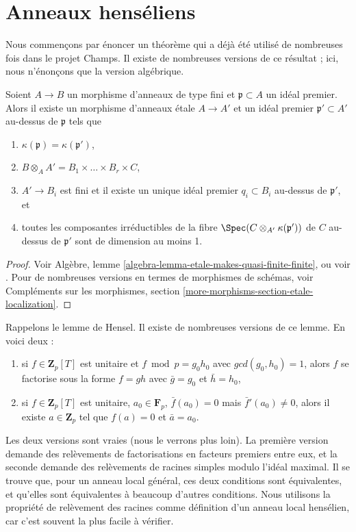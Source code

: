 \section{Anneaux hens\'eliens}
\label{section-henselian-ring}

\noindent
Nous commen\c{c}ons par \'enoncer un th\'eor\`eme qui a d\'ej\`a \'et\'e utilis\'e de nombreuses fois
dans le projet Champs. Il existe de nombreuses versions de ce r\'esultat ; ici, nous
n'\'enon\c{c}ons que la version alg\'ebrique.

\begin{theorem}
\label{theorem-quasi-finite-etale-locally}
Soient $A\to B$ un morphisme d'anneaux de type fini et $\mathfrak p \subset A$ un
id\'eal premier. Alors il existe un morphisme d'anneaux \'etale $A \to A'$ et un id\'eal premier
$\mathfrak p' \subset A'$ au-dessus de $\mathfrak p$ tels que
\begin{enumerate}
\item
$\kappa(\mathfrak p) = \kappa(\mathfrak p')$,
\item
$ B \otimes_A A' = B_1\times \ldots \times B_r \times C$,
\item
$ A'\to B_i$ est fini et il existe un unique id\'eal premier $q_i\subset B_i$ au-dessus
de $\mathfrak p'$, et
\item toutes les composantes irr\'eductibles de la fibre
$\Spec(C \otimes_{A'} \kappa(\mathfrak p'))$ de $C$ au-dessus de $\mathfrak p'$
sont de dimension au moins 1.
\end{enumerate}
\end{theorem}

\begin{proof}
Voir Algèbre, lemme \ref{algebra-lemma-etale-makes-quasi-finite-finite}, ou
voir \cite[Th\'eor\`eme 18.12.1]{EGA4}. Pour de nombreuses versions en termes de
morphismes de sch\'emas, voir
Compléments sur les morphismes, section \ref{more-morphisms-section-etale-localization}.
\end{proof}

\noindent
Rappelons le lemme de Hensel.
Il existe de nombreuses versions de ce lemme. En voici deux :
\begin{enumerate}
\item[(f)] si $f\in \mathbf{Z}_p[T]$ est unitaire et
$f \bmod p = g_0 h_0$ avec $gcd(g_0, h_0) = 1$, alors $f$ se factorise
sous la forme $f = gh$ avec $\bar g = g_0$ et $\bar h = h_0$,
\item[(r)] si $f \in \mathbf{Z}_p[T]$ est unitaire, $a_0 \in \mathbf{F}_p$,
$\bar f(a_0) =0$ mais $\bar f'(a_0) \neq 0$,
alors il existe $a \in \mathbf{Z}_p$ tel que
$f(a) = 0$ et $\bar a = a_0$.
\end{enumerate}
Les deux versions sont vraies (nous le verrons plus loin). La premi\`ere version
demande des rel\`evements de factorisations en facteurs premiers entre eux,
et la seconde demande des rel\`evements de racines simples
modulo l'id\'eal maximal. Il se trouve que, pour un anneau local g\'en\'eral,
ces deux conditions sont \'equivalentes, et qu'elles sont
\'equivalentes \`a beaucoup d'autres conditions. Nous utilisons la propri\'et\'e de rel\`evement
des racines comme d\'efinition d'un anneau local hens\'elien, car c'est
souvent la plus facile \`a v\'erifier.

